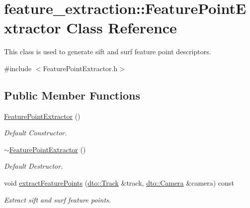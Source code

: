 \hypertarget{classfeature__extraction_1_1_feature_point_extractor}{}\section{feature\+\_\+extraction\+:\+:Feature\+Point\+Extractor Class Reference}
\label{classfeature__extraction_1_1_feature_point_extractor}


This class is used to generate sift and surf feature point descriptors.  




{\ttfamily \#include $<$Feature\+Point\+Extractor.\+h$>$}

\subsection*{Public Member Functions}
\begin{DoxyCompactItemize}
\item 
\mbox{\label{classfeature__extraction_1_1_feature_point_extractor_a85052c751ca3515427afe7ffb9004348}} 
\mbox{\hyperlink{classfeature__extraction_1_1_feature_point_extractor_a85052c751ca3515427afe7ffb9004348}{Feature\+Point\+Extractor}} ()
\begin{DoxyCompactList}\small\item\em Default Constructor. \end{DoxyCompactList}\item 
\mbox{\label{classfeature__extraction_1_1_feature_point_extractor_a97e33635a09cbae031eb7de489bbb689}} 
\mbox{\hyperlink{classfeature__extraction_1_1_feature_point_extractor_a97e33635a09cbae031eb7de489bbb689}{$\sim$\+Feature\+Point\+Extractor}} ()
\begin{DoxyCompactList}\small\item\em Default Destructor. \end{DoxyCompactList}\item 
\mbox{\label{classfeature__extraction_1_1_feature_point_extractor_a263158dae179c8057ceb0eda6771dcb8}} 
void \mbox{\hyperlink{classfeature__extraction_1_1_feature_point_extractor_a263158dae179c8057ceb0eda6771dcb8}{extract\+Feature\+Points}} (\mbox{\hyperlink{structdto_1_1_track}{dto\+::\+Track}} \&track, \mbox{\hyperlink{structdto_1_1_camera}{dto\+::\+Camera}} \&camera) const
\begin{DoxyCompactList}\small\item\em Extract sift and surf feature points. \end{DoxyCompactList}\end{DoxyCompactItemize}


